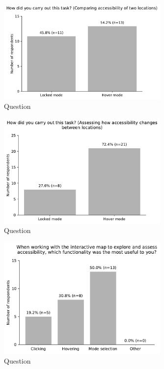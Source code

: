 \begin{figure}[H]
	\centering
	\includegraphics[width=0.75\textwidth]{images/questionnaire/5.pdf}
	\caption{Question}
	\label{fig:architechture}
\end{figure}

\begin{figure}[H]
	\centering
	\includegraphics[width=0.75\textwidth]{images/questionnaire/6.pdf}
	\caption{Question}
	\label{fig:architechture}
\end{figure}

\begin{figure}[H]
	\centering
	\includegraphics[width=0.75\textwidth]{images/questionnaire/7.pdf}
	\caption{Question}
	\label{fig:architechture}
\end{figure}

